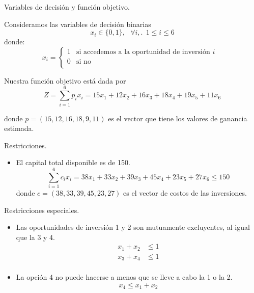 \documentclass{beamer}
\begin{document}
\begin{frame}[fragile]{Variables de decisión y función objetivo.}
  
  Consideramos las variables de decisión binarias 
  \[
    x_{i} \in \{0,1\}, \ \ \ \forall i,. \ \  1 \le i \le 6
  \]
  donde: 
  \[
  x_{i} = 
    \begin{cases}
      1 & \text{si accedemos a la oportunidad de inversión $i$  } \\
      0 & \text{si no} \\
    \end{cases}
  \]

  \pause 

  Nuestra función objetivo está dada por 
  \[
    Z = \sum_{i=1}^{6} p_{i}x_{i} = 15x_{1} + 12x_{2} + 16x_{3} + 18x_{4} + 19x_{5} + 11x_{6}
  \]
  
  donde $p = (15,12,16,18,9,11)$ es el vector que tiene los valores de ganancia estimada.

\end{frame}

\begin{frame}[fragile]{Restricciones.}
  \begin{itemize}
    \item El capital total disponible es de 150.
    \pause 
      \[
        \sum_{i=1}^{6} c_{i}x_{i} =  38x_{1} + 33x_{2} + 39x_{3} + 45x_{4} + 23x_{5} + 27x_{6}
        \le 150
      \]
      donde $c = (38,33,39,45,23,27)$ es el vector de costos de las inversiones.
    
  \end{itemize}
\end{frame}

\begin{frame}[fragile]{Restricciones especiales.}
  \begin{itemize}
    \item Las oportunidades de inversión 1 y 2 son mutuamente excluyentes, al igual que la 3 y 4.
    \pause 
      \begin{align*}
        x_{1} + x_{2} &\le 1 \\
        x_{3} + x_{4} &\le 1 \\
      \end{align*}
    \pause   

    \item La opción 4 no puede hacerse a menos que se lleve a cabo la 1 o la 2.
    \pause 
    \[
      x_{4} \le x_{1} + x_{2}
    \]
  \end{itemize}
\end{frame}
\end{document}
